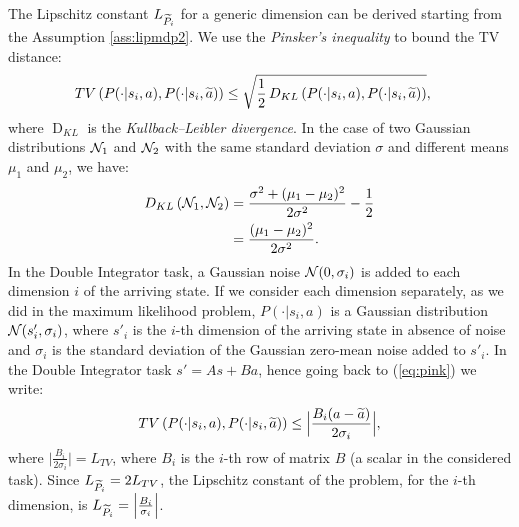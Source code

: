\newline
The Lipschitz constant $L_{\widetilde{P}_{i}}$ for a generic dimension can be derived starting from the Assumption \ref{ass:lipmdp2}. We use the \emph{Pinsker's inequality} to bound the \ac{TV} distance:
\begin{align}
\mathop{TV}\left(P(\cdot|s_{i},a), P(\cdot| s_{i},\widetilde{a})\right) &\leq \sqrt{\frac{1}{2}\mathop{D_{KL}}\left(P(\cdot|s_{i},a), P(\cdot| s_{i},\widetilde{a})\right)}, \label{eq:pink}
\end{align}
where $\mathop{D}_{KL}$ is the \emph{Kullback–Leibler divergence}. In the case of two Gaussian distributions $\mathcal{N}_1$ and $\mathcal{N}_2$ with the same standard deviation $\sigma$ and different means $\mu_1$ and $\mu_2$, we have:
\begin{align}
	\mathop{D_{KL}}\left(\mathcal{N}_1, \mathcal{N}_2\right) &= \frac{\sigma^2 + (\mu_1 - \mu_2)^2}{2\sigma^2} - \frac{1}{2} \nonumber\\
	&= \frac{(\mu_1 - \mu_2)^2}{2\sigma^2}.
\end{align}
In the Double Integrator task, a Gaussian noise $\mathcal{N}(0, \sigma_{i})$ is added to each dimension $i$ of the arriving state. If we consider each dimension separately, as we did in the maximum likelihood problem, $P(\cdot|s_{i},a)$ is a Gaussian distribution $\mathcal{N}(s'_{i}, \sigma_{i})$, where $s'_{i}$ is the $i$-th dimension of the arriving state in absence of noise and $\sigma_{i}$ is the standard deviation of the Gaussian zero-mean noise added to $s'_{i}$. In the Double Integrator task $s' = As + Ba$, hence going back to (\ref{eq:pink}) we write:
\begin{align}
	\mathop{TV}\left(P(\cdot|s_{i},a), P(\cdot| s_{i},\widetilde{a})\right) \leq \Big| \frac{B_{i} (a - \widetilde{a})}{2\sigma_{i}}\Big|,
\end{align}
where $\Big| \frac{B_{i}}{2\sigma_{i}} \Big| = L_{TV}$, where $B_{i}$ is the $i$-th row of matrix $B$ (a scalar in the considered task). Since $L_{\widetilde{P}_{i}}=2L_{TV}$, the Lipschitz constant of the problem, for the $i$-th dimension, is $L_{\widetilde{P}_{i}} = \Big| \frac{B_{i}}{\sigma_{i}} \Big|$.